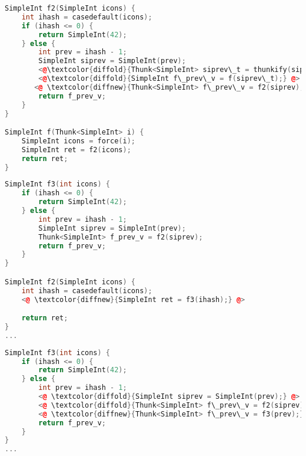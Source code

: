 \documentclass[sigplan,\review anonymous]{acmart}
\begin{document}
\begin{lstlisting}[language=c++, caption=Step 2: Removing the un-necessary lazy recursive call]
SimpleInt f2(SimpleInt icons) {
    int ihash = casedefault(icons);
    if (ihash <= 0) {
        return SimpleInt(42);
    } else {
        int prev = ihash - 1;
        SimpleInt siprev = SimpleInt(prev);
        <@\textcolor{diffold}{Thunk<SimpleInt> siprev\_t = thunkify(siprev);}@>
        <@\textcolor{diffold}{SimpleInt f\_prev\_v = f(siprev\_t);} @>
       <@ \textcolor{diffnew}{Thunk<SimpleInt> f\_prev\_v = f2(siprev);} @>
        return f_prev_v;
    }
}

SimpleInt f(Thunk<SimpleInt> i) {
    SimpleInt icons = force(i);
    SimpleInt ret = f2(icons);
    return ret;
}
\end{lstlisting}

{\footnotesize
\begin{lstlisting}[language=c++, caption=Step 3: outline everything after casedefault into f3]
SimpleInt f3(int icons) {
    if (ihash <= 0) {
        return SimpleInt(42);
    } else {
        int prev = ihash - 1;
        SimpleInt siprev = SimpleInt(prev);
        Thunk<SimpleInt> f_prev_v = f2(siprev);
        return f_prev_v;
    }
}

SimpleInt f2(SimpleInt icons) {
    int ihash = casedefault(icons);
    <@ \textcolor{diffnew}{SimpleInt ret = f3(ihash);} @>

    return ret;
}
...
\end{lstlisting}
}

{\footnotesize
\begin{lstlisting}[language=c++, caption=replace call \texttt{f2(SimpleInt(prev))} to \texttt{f3(prev)}]
SimpleInt f3(int icons) {
    if (ihash <= 0) {
        return SimpleInt(42);
    } else {
        int prev = ihash - 1;
        <@ \textcolor{diffold}{SimpleInt siprev = SimpleInt(prev);} @>
        <@ \textcolor{diffold}{Thunk<SimpleInt> f\_prev\_v = f2(siprev);} @>
        <@ \textcolor{diffnew}{Thunk<SimpleInt> f\_prev\_v = f3(prev);} @>
        return f_prev_v;
    }
}
...
\end{lstlisting}
}
\end{document}
